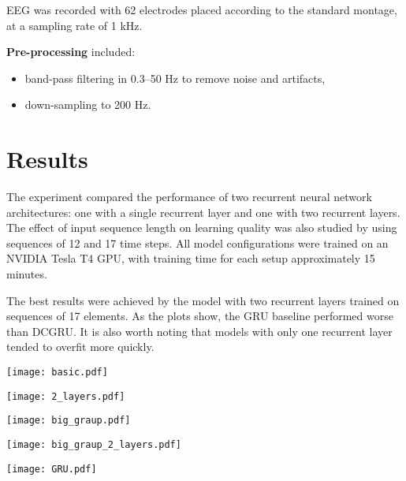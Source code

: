 \documentclass[12pt, twoside]{article}
\begin{document}
EEG was recorded with 62 electrodes placed according to the standard montage, at a sampling rate of 1 kHz.

\textbf{Pre-processing} included:
\begin{itemize}
    \item band-pass filtering in 0.3–50 Hz to remove noise and artifacts,
    \item down-sampling to 200 Hz.
\end{itemize}
\section{Results}

The experiment compared the performance of two recurrent neural network architectures: one with a single recurrent layer and one with two recurrent layers. The effect of input sequence length on learning quality was also studied by using sequences of 12 and 17 time steps. All model configurations were trained on an NVIDIA Tesla T4 GPU, with training time for each setup approximately 15 minutes.

The best results were achieved by the model with two recurrent layers trained on sequences of 17 elements. As the plots show, the GRU baseline performed worse than DCGRU. It is also worth noting that models with only one recurrent layer tended to overfit more quickly.

\begin{center}
\texttt{[image: basic.pdf]}
\end{center}

\begin{center}
\texttt{[image: 2\_layers.pdf]}
\end{center}

\begin{center}
\texttt{[image: big\_graup.pdf]}
\end{center}

\begin{center}
\texttt{[image: big\_graup\_2\_layers.pdf]}
\end{center}

\begin{center}
\texttt{[image: GRU.pdf]}
\end{center}
\end{document}
